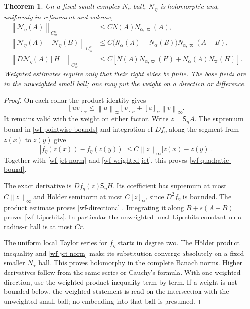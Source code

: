 \documentclass[11pt]{article}
\newtheorem{theorem}{Theorem}[section]
\theoremstyle{remark}
\newcommand{\norm}[1]{\left\|#1\right\|}
\begin{document}
\begin{theorem}\label{wf-nonlinear-theorem}
On a fixed small complex $N_\alpha$ ball, $\mathcal N_\eta$
is holomorphic and, uniformly in refinement and volume,
\begin{align}
 \norm{\mathcal N_\eta(A)}_{C^\alpha_\varpi}
       &\le C N(A)N_{\alpha,\varpi}(A),
                                           \label{wf-quadratic-bound}\\
 \norm{\mathcal N_\eta(A)-\mathcal N_\eta(B)}_{C^\alpha_\varpi}
       &\le C\bigl(N_\alpha(A)+N_\alpha(B)\bigr)
                             N_{\alpha,\varpi}(A-B),
                                           \label{wf-Lipschitz}\\
 \norm{D\mathcal N_\eta(A)[H]}_{C^\alpha_\varpi}
       &\le C\left[N(A)N_{\alpha,\varpi}(H)
                         +N_\alpha(A)N_\varpi(H)\right].
                                           \label{wf-directional}
\end{align}
Weighted estimates require only that their right sides be
finite. The base fields are in the unweighted small ball;
one may put the weight on a direction or difference.
\end{theorem}

\begin{proof}
On each collar the product identity gives
\[
 [uv]_\alpha\le\norm{u}_\infty[v]_\alpha
                         +[u]_\alpha\norm{v}_\infty.
\]
It remains valid with the weight on either factor.
Write $z=\mathsf S_\eta A$. The supremum bound in
\eqref{wf-pointwise-bounds} and integration of $Df_\eta$
along the segment from $z(x)$ to $z(y)$ give
\[
 |f_\eta(z(x))-f_\eta(z(y))|
       \le C\norm{z}_\infty|z(x)-z(y)|.
\]
Together with \eqref{wf-jet-norm} and
\eqref{wf-weighted-jet}, this proves
\eqref{wf-quadratic-bound}.

The exact derivative is
$Df_\eta(z)\mathsf S_\eta H$. Its coefficient has supremum
at most $C\norm{z}_\infty$ and H\"older seminorm at most
$C[z]_\alpha$, since $D^2f_\eta$ is bounded. The product
estimate proves \eqref{wf-directional}. Integrating it
along $B+s(A-B)$ proves \eqref{wf-Lipschitz}. In particular
the unweighted local Lipschitz constant on a radius-$r$
ball is at most $Cr$.

The uniform local Taylor series for $f_\eta$ starts in
degree two. The H\"older product inequality and
\eqref{wf-jet-norm} make its substitution converge
absolutely on a fixed smaller $N_\alpha$ ball. This proves
holomorphy in the complete Banach norms. Higher derivatives
follow from the same series or Cauchy's formula. With one
weighted direction, use the weighted product inequality
term by term. If a weight is not bounded below, the weighted
statement is read on the intersection with the unweighted
small ball; no embedding into that ball is presumed.
\end{proof}
\end{document}
